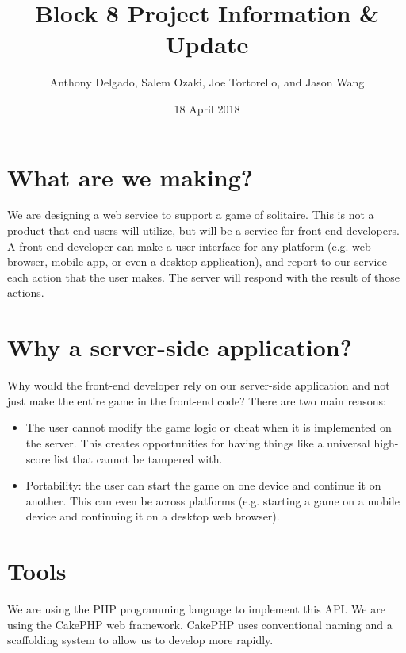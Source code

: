 \documentclass[11pt]{article}
\title{Block 8 Project Information \& Update}
\author{Anthony Delgado, Salem Ozaki, Joe Tortorello, and Jason Wang}
\date{18 April 2018}
\begin{document}



\maketitle
\section*{What are we making?}
We are designing a web service to support a game of solitaire. This is not a product that end-users will utilize, but will be a service for front-end developers. A front-end developer can make a user-interface for any platform (e.g. web browser, mobile app, or even a desktop application), and report to our service each action that the user makes. The server will respond with the result of those actions.

\section*{Why a server-side application?}
Why would the front-end developer rely on our server-side application and not just make the entire game in the front-end code? There are two main reasons:
\vspace{-3mm}
\begin{itemize}
	\item The user cannot modify the game logic or cheat when it is implemented on the server. This creates opportunities for having things like a universal high-score list that cannot be tampered with.
	\vspace{-3mm}
	\item Portability: the user can start the game on one device and continue it on another. This can even be across platforms (e.g. starting a game on a mobile device and continuing it on a desktop web browser).
\end{itemize}
\vspace{-3mm}

\section*{Tools}
We are using the PHP programming language to implement this API. We are using the CakePHP web framework. CakePHP uses conventional naming and a scaffolding system to allow us to develop more rapidly.
\end{document}
